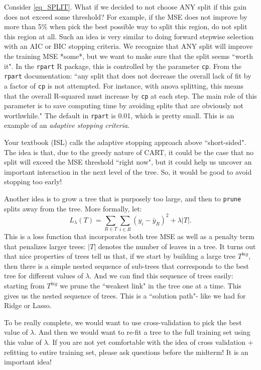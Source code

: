 Consider \eqref{eq_SPLIT}. What if we decided to not choose ANY split if this gain does not exceed some threshold? For example, if the MSE does not improve by more than 5\% when pick the best possible way to split this region, do not split this region at all. Such an idea is very similar to doing forward stepwise selection with an AIC or BIC stopping criteria. We recognize that ANY split will improve the training MSE *some*, but we want to make sure that the split seems ``worth it". In the \texttt{rpart} R package, this is controlled by the parameter \texttt{cp}. From the \texttt{rpart} documentation: ``any split that does not decrease the overall lack of fit by a factor of \texttt{cp} is not attempted. For instance, with anova splitting, this means that the overall R-squared must increase by \texttt{cp} at each step. The main role of this parameter is to save computing time by avoiding splits that are obviously not worthwhile." The default in \texttt{rpart} is 0.01, which is pretty small. This is an example of an \emph{adaptive stopping criteria}. 

Your textbook (ISL) calls the adaptive stopping approach above ``short-sided". The idea is that, due to the greedy nature of CART, it could be the case that no split will exceed the MSE threshold ``right now", but it could help us uncover an important interaction in the next level of the tree. So, it would be good to avoid stopping too early! 

Another idea is to grow a tree that is purposely too large, and then to \texttt{prune} splits away from the tree. More formally, let:
$$
L_\lambda(T) = \sum_{R \in T} \sum_{i \in R} (y_i - \bar{y}_R)^2 + \lambda |T|.
$$
This is a loss function that incorporates both tree MSE as well as a penalty term that penalizes larger trees: $|T|$ denotes the number of leaves in a tree. It turns out that nice properties of trees tell us that, if we start by building a large tree $T^{big}$, then there is a simple nested sequence of sub-trees that corresponds to the best tree for different values of $\lambda$. And we can find this sequence of trees easily: starting from $T^{big}$ we prune the ``weakest link" in the tree one at a time. This gives us the nested sequence of trees. This is a ``solution path"- like we had for Ridge or Lasso.  

To be really complete, we would want to use cross-validation to pick the best value of $\lambda$. And then we would want to re-fit a tree to the full training set using this value of $\lambda$. If you are not yet comfortable with the idea of cross validation + refitting to entire training set, please ask questions before the midterm! It is an important idea! 

